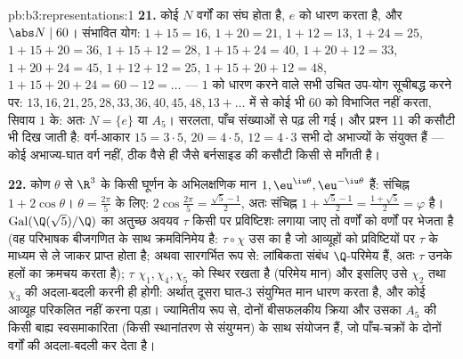 \begin{solution}{pb:b3:representations:1}
\textbf{21.} कोई  $N$ वर्गों का संघ होता है,
$e$ को धारण करता है, और $\abs N \mid 60$। संभावित योग: $1{+}15 = 16$, $1{+}20 = 21$, $1{+}12 = 13$,
$1{+}24 = 25$, $1{+}15{+}20 = 36$, $1{+}15{+}12 = 28$, $1{+}15{+}24 = 40$, $1{+}20{+}12 = 33$, $1{+}20{+}24 = 45$, $1{+}12{+}12 = 25$, $1{+}15{+}20{+}12 = 48$, $1{+}15{+}20{+}24 = 60 - 12 = \dots$ ---
$1$ को धारण करने वाले सभी उचित उप-योग सूचीबद्ध करने पर: $13, 16,
21, 25, 28, 33, 36, 40, 45, 48, 13{+}\dots$ में
से कोई भी $60$ को विभाजित नहीं करता, सिवाय $1$ के: अतः $N = \{e\}$ या
$A_5$। सरलता, पाँच संख्याओं से पढ़ ली गई। और प्रश्न 11 की कसौटी भी
दिख जाती है: वर्ग-आकार $15 = 3\cdot5$, $20 = 4\cdot5$, $12 = 4\cdot3$ सभी दो अभाज्यों के संयुक्त
हैं --- कोई अभाज्य-घात वर्ग नहीं, ठीक वैसे ही जैसे बर्नसाइड की कसौटी
किसी  से माँगती है।

\textbf{22.} कोण $\theta$ से $\R^3$ के किसी घूर्णन के अभिलक्षणिक मान
$1, \eu^{\iu\theta}, \eu^{-\iu\theta}$ हैं: संचिह्न $1 +
2\cos\theta$। $\theta = \frac{2\pi}5$ के लिए: $2\cos\frac{2\pi}5
= \frac{\sqrt5 - 1}2$, अतः संचिह्न $1 + \frac{\sqrt5-1}2 =
\frac{1+\sqrt5}2 = \varphi$
है। $\operatorname{Gal}(\Q(\sqrt5)/\Q)$ का अतुच्छ अवयव $\tau$ किसी  पर प्रविष्टिशः लगाया
जाए तो वर्णों को वर्णों पर भेजता है (वह परिभाषक बीजगणित के साथ
क्रमविनिमेय है: $\tau\circ\chi$ उस  का  है जो आव्यूहों को प्रविष्टियों
पर $\tau$ के माध्यम से ले जाकर प्राप्त होता है; अथवा सारगर्भित रूप
से: लांबिकता संबंध $\Q$-परिमेय हैं, अतः $\tau$ उनके हलों का क्रमचय
करता है); $\tau$ $\chi_1, \chi_4, \chi_5$ को स्थिर रखता है (परिमेय मान) और इसलिए उसे
$\chi_2$ तथा $\chi_3$ की अदला-बदली करनी ही होगी: अर्थात् दूसरा घात-$3$
 संयुग्मित मान धारण करता है, और कोई आव्यूह परिकलित नहीं करना
पड़ा। ज्यामितीय रूप से, दोनों  बीसफलकीय क्रिया और उसका $A_5$
की किसी बाह्य स्वसमाकारिता (किसी स्थानांतरण से संयुग्मन) के साथ
संयोजन हैं, जो पाँच-चक्रों के दोनों वर्गों की अदला-बदली कर देता है।


\end{solution}
